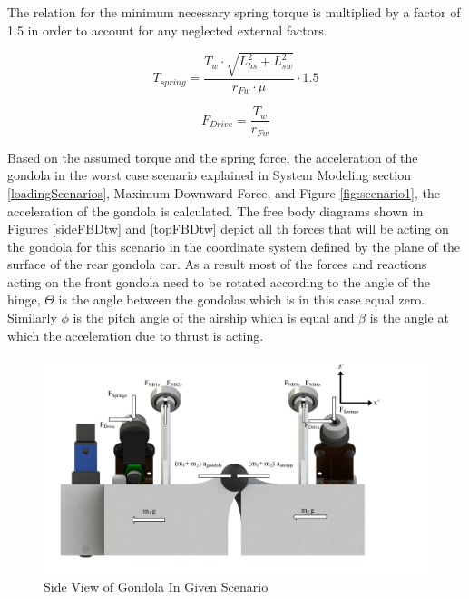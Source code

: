 \documentclass[../main.tex]{subfiles}
\begin{document}
The relation for the minimum necessary spring torque is multiplied by a factor of 1.5 in order to account for any neglected external factors.

\begin{equation}
\label{eqn:springTorque}
T_{spring} = \frac{T_w\cdot{\sqrt{L_{hs}^2+L_{sw}^2}}}{r_{Fw}\cdot{}\mu}\cdot{1.5}
\end{equation}

\begin{equation}
\label{eqn:driveForce}
F_{Drive} = \frac{T_w}{r_{Fw}}
\end{equation}

Based on the assumed torque and the spring force, the acceleration of the gondola in the worst case scenario explained in System Modeling section \ref{loadingScenarios}, Maximum Downward Force, and Figure \ref{fig:scenario1}, the acceleration of the gondola is calculated. The free body diagrams shown in Figures \ref{sideFBDtw} and \ref{topFBDtw} depict all th forces that will be acting on the gondola for this scenario in the coordinate system defined by the plane of the surface of the rear gondola car. As a result most of the forces and reactions acting on the front gondola need to be rotated according to the angle of the hinge, $\Theta$ is the angle between the gondolas which is in this case equal zero. Similarly $\phi$ is the pitch angle of the airship which is equal  and $\beta$ is the angle at which the acceleration due to thrust is acting. 
\begin{figure}[H]
	\centering
	\includegraphics[width=1.1\linewidth]{img/gondola/gondolaSideTW.pdf}
	\caption{Side View of Gondola In Given Scenario}
	\label{fig:gondolaSideTW}
\end{figure}
\end{document}
